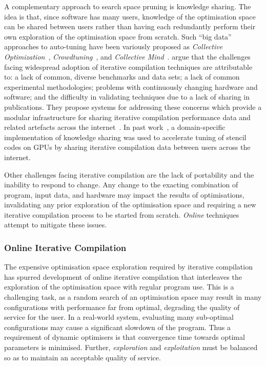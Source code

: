 A complementary approach to search space pruning is knowledge sharing. The idea is that, since software has many users, knowledge of the optimisation space can be shared between users rather than having each redundantly perform their own exploration of the optimisation space from scratch. Such ``big data'' approaches to auto-tuning have been variously proposed as \emph{Collective Optimization}~\cite{Saclay2010}, \emph{Crowdtuning}~\cite{Memon2013}, and \emph{Collective Mind}~\cite{Fursin2014}. \citeauthor{Fursin2014} argue that the challenges facing widespread adoption of iterative compilation techniques are attributable to: a lack of common, diverse benchmarks and data sets; a lack of common experimental methodologies; problems with continuously changing hardware and software; and the difficulty in validating techniques due to a lack of sharing in publications. They propose systems for addressing these concerns which provide a modular infrastructure for sharing iterative compilation performance data and related artefacts across the internet~\cite{Fursin2014}. In past work~\cite{Cummins2016}, a domain-specific implementation of knowledge sharing was used to accelerate tuning of stencil codes on GPUs by sharing iterative compilation data between users across the internet.

Other challenges facing iterative compilation are the lack of portability and the inability to respond to change. Any change to the exacting combination of program, input data, and hardware may impact the results of optimisations, invalidating any prior exploration of the optimisation space and requiring a new iterative compilation process to be started from scratch. \emph{Online} techniques attempt to mitigate these issues.


\subsubsection{Online Iterative Compilation}

The expensive optimisation space exploration required by iterative compilation has spurred development of online iterative compilation that interleaves the exploration of the optimisation space with regular program use. This is a challenging task, as a random search of an optimisation space may result in many configurations with performance far from optimal, degrading the quality of service for the user. In a real-world system, evaluating many sub-optimal configurations may cause a significant slowdown of the program. Thus a requirement of dynamic optimisers is that convergence time towards optimal parameters is minimised. Further, \emph{exploration} and \emph{exploitation} must be balanced so as to maintain an acceptable quality of service.

